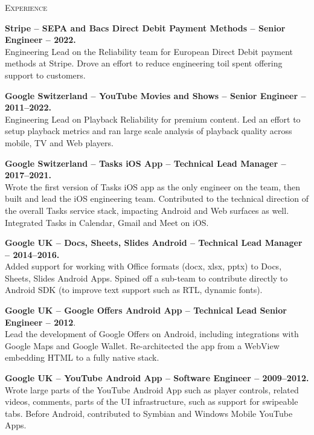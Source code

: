 \documentclass[10pt]{article}
\begin{document}
\vspace{0.16in}
\noindent
\textcolor{Primary}{{\large \textsc{Experience}}}
\begin{list}{}{\leftmargin=0em}

\item
{\bf Stripe -- SEPA and Bacs Direct Debit Payment Methods -- Senior Engineer -- 2022.}\\
Engineering Lead on the Reliability team for European Direct Debit payment methods at Stripe. Drove an effort to reduce engineering toil spent offering support to customers.
  
\item
{\bf Google Switzerland -- YouTube Movies and Shows -- Senior Engineer -- 2011--2022.}\\
Engineering Lead on Playback Reliability for premium content. Led an effort to setup playback metrics and ran large scale analysis of playback quality across mobile, TV and Web players.

\item
{\bf Google Switzerland -- Tasks iOS App -- Technical Lead Manager -- 2017--2021.}\\
Wrote the first version of Tasks iOS app as the only engineer on the team, then built and lead the iOS engineering team.
Contributed to the technical direction of the overall Tasks service stack, impacting Android and Web surfaces
as well. Integrated Tasks in Calendar, Gmail and Meet on iOS.
  
\item
{\bf Google UK -- Docs, Sheets, Slides Android -- Technical Lead Manager -- 2014--2016.}\\
Added support for working with Office formats (docx, xlsx, pptx) to Docs, Sheets, Slides Android Apps. Spined off a
sub-team to contribute directly to Android SDK (to improve text support such as RTL, dynamic fonts). 

\item
{\bf Google UK -- Google Offers Android App -- Technical Lead Senior Engineer -- 2012}.\\
Lead the development of Google Offers on Android, including integrations with Google Maps and Google Wallet.
Re-architected the app from a WebView embedding HTML to a fully native stack.

\item
{\bf Google UK -- YouTube Android App -- Software Engineer -- 2009--2012.}\\
Wrote large parts of the YouTube Android App such as player controls, related videos, comments, parts of the UI 
infrastructure, such as support for swipeable tabs.
Before Android, contributed to Symbian and Windows Mobile YouTube Apps.


\end{list}
\end{document}

